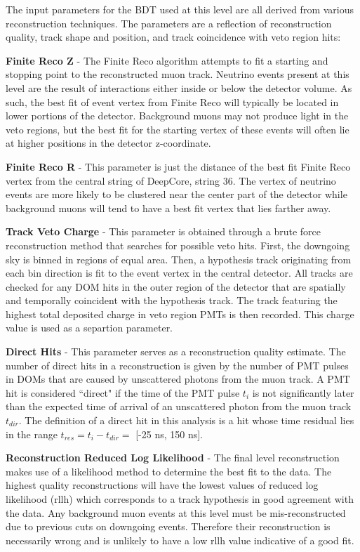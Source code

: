 \documentclass{gatech-thesis}
\begin{document}
The input parameters for the BDT used at this level are all derived from various reconstruction techniques. The parameters are a reflection of reconstruction quality, track shape and position, and track coincidence with veto region hits:
\begin{adjustwidth}{2.5em}{2.5em}
\setlength{\parindent}{0pt}
\textbf{Finite Reco Z} - The Finite Reco algorithm attempts to fit a starting and stopping point to the reconstructed muon track. Neutrino events present at this level are the result of interactions either inside or below the detector volume. As such, the best fit of event vertex from Finite Reco will typically be located in lower portions of the detector. Background muons may not produce light in the veto regions, but the best fit for the starting vertex of these events will often lie at higher positions in the detector z-coordinate.

\textbf{Finite Reco R} - This parameter is just the distance of the best fit Finite Reco vertex from the central string of DeepCore, string 36. The vertex of neutrino events are more likely to be clustered near the center part of the detector while background muons will tend to have a best fit vertex that lies farther away.

\textbf{Track Veto Charge} - This parameter is obtained through a brute force reconstruction method that searches for possible veto hits. First, the downgoing sky is binned in regions of equal area. Then, a hypothesis track originating from each bin direction is fit to the event vertex in the central detector. All tracks are checked for any DOM hits in the outer region of the detector that are spatially and temporally coincident with the hypothesis track. The track featuring the highest total deposited charge in veto region PMTs is then recorded. This charge value is used as a separtion parameter.

\textbf{Direct Hits} - This parameter serves as a reconstruction quality estimate. The number of direct hits in a reconstruction is given by the number of PMT pulses in DOMs that are caused by unscattered photons from the muon track. A PMT hit is considered ``direct" if the time of the PMT pulse $t_i$ is not significantly later than the expected time of arrival of an unscattered photon from the muon track $t_{dir}$. The definition of a direct hit in this analysis is a hit whose time residual lies in the range $t_{res} = t_{i} - t_{dir} =$ [-25 ns, 150 ns].

\textbf{Reconstruction Reduced Log Likelihood} - The final level reconstruction makes use of a likelihood method to determine the best fit to the data. The highest quality reconstructions will have the lowest values of reduced log likelihood (rllh) which corresponds to a track hypothesis in good agreement with the data. Any background muon events at this level must be mis-reconstructed due to previous cuts on downgoing events. Therefore their reconstruction is necessarily wrong and is unlikely to have a low rllh value indicative of a good fit.


\end{adjustwidth}
\end{document}
